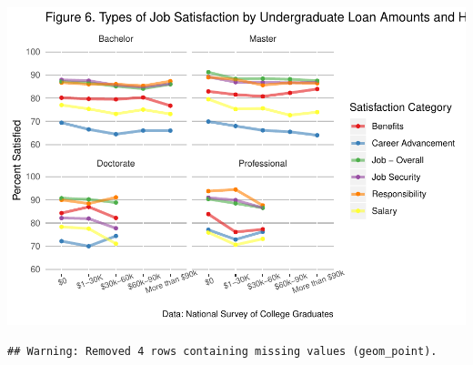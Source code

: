 \documentclass[]{article}
\begin{document}
\includegraphics{Report_Draft_04282019_files/figure-latex/unnamed-chunk-7-1.pdf}

\begin{verbatim}
## Warning: Removed 4 rows containing missing values (geom_point).
\end{verbatim}
\end{document}
